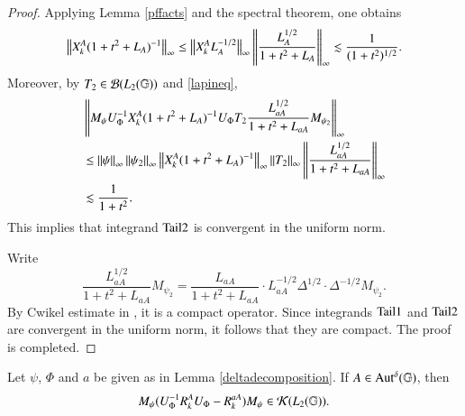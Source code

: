\documentclass[leqno]{amsart}
\begin{document}
\begin{proof}
		
		Applying Lemma \ref{pffacts} and the spectral theorem, one obtains
		\begin{align*}
			\left\| X_{k}^{A}(1+t^{2}+ L_{A})^{-1} \right\|_{\infty}
			\leq\left\| X_{k}^{A} L_{A}^{-1/2} \right\|_{\infty}\left\| \frac{ L_{A}^{1/2}}{1+t^{2}+ L_{A}} \right\|_{\infty}
			\lesssim\frac{1}{(1+t^{2})^{1/2}}.
		\end{align*}
		Moreover, by $T_{2}\in{\mathcal B}(L_{2}(\mathbb{G}))$ and \eqref{lapineq},
		\begin{align*}
			&\left\| M_{\psi}U_{\Phi}^{-1} X_{k}^{A}(1+t^{2}+ L_{A})^{-1}U_{\Phi}T_{2}\frac{ L_{aA}^{1/2}}{1+t^{2}+ L_{aA}}M_{\psi_{2}} \right\|_{\infty}\\
			&\leq\left\| \psi \right\|_{\infty}\left\| \psi_{2} \right\|_{\infty}\left\| X_{k}^{A}(1+t^{2}+ L_{A})^{-1} \right\|_{\infty}
			\left\| T_{2} \right\|_{\infty}\left\| \frac{ L_{aA}^{1/2}}{1+t^{2}+ L_{aA}} \right\|_{\infty}\\
			&\lesssim\frac{1}{1+t^{2}}.
		\end{align*}
		This implies that integrand ${\rm Tail2}$ is convergent in the uniform norm.
		
		Write
		$$\frac{ L_{aA}^{1/2}}{1+t^{2}+ L_{aA}}M_{\psi_{2}}=\frac{ L_{aA}}{1+t^{2}+ L_{aA}}\cdot L_{aA}^{-1/2} \Delta^{1/2}\cdot \Delta^{-1/2}M_{\psi_{2}}.$$
		By Cwikel estimate in \cite{MSZ-Cwikel}, it is a compact operator. 
		Since integrands ${\rm Tail1}$ and ${\rm Tail2}$ are convergent in the uniform norm, it follows that they are compact.
		The proof is completed.
	\end{proof}
	
	
	
	
	\begin{proposition}\label{rieszcompact}
		Let $\psi$, $\Phi$ and $a$ be given as in Lemma \ref{deltadecomposition}. If $A\in{\rm Aut^{\delta}}(\mathbb{G})$, then
		\begin{align*}
			M_{\psi}(U_{\Phi}^{-1} { R}^{A}_{k}U_{\Phi}-{ R}^{aA}_{k})M_{\psi}\in{\mathcal K}(L_{2}(\mathbb{G})).
		\end{align*}
	\end{proposition}
	
\end{document}
